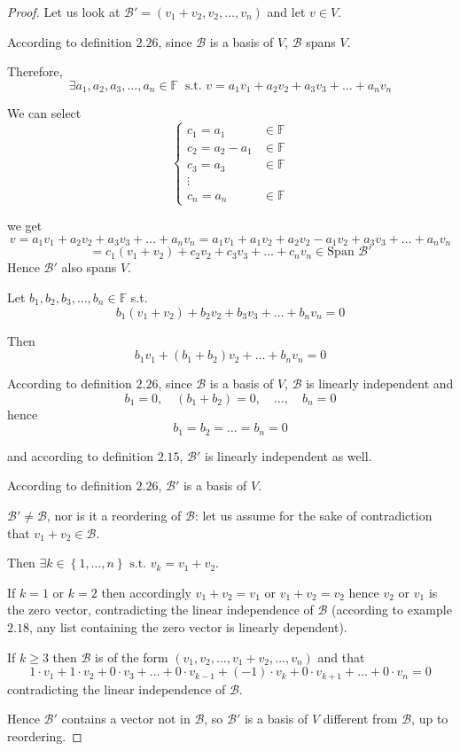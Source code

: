 \documentclass[english]{article}
\theoremstyle{definition}
\theoremstyle{plain}
\theoremstyle{remark}
\theoremstyle{plain}
\theoremstyle{plain}
\begin{document}
\begin{proof}
Let us look at $\mathcal{B}'=\left(v_{1}+v_{2},v_{2},\dots,v_{n}\right)$
and let $v\in V$.

According to definition $2.26$, since $\mathcal{B}$ is a basis of
$V$, $\mathcal{B}$ spans $V$. 

Therefore, 
\[
\exists a_{1},a_{2},a_{3},\dots,a_{n}\in\mathbb{F}\ \text{ s.t. }v=a_{1}v_{1}+a_{2}v_{2}+a_{3}v_{3}+\dots+a_{n}v_{n}
\]

We can select
\[
\begin{cases}
c_{1}=a_{1} & \in\mathbb{F}\\
c_{2}=a_{2}-a_{1} & \in\mathbb{F}\\
c_{3}=a_{3} & \in\mathbb{F}\\
\vdots\\
c_{n}=a_{n} & \in\mathbb{F}
\end{cases}
\]

we get 
\[
v=a_{1}v_{1}+a_{2}v_{2}+a_{3}v_{3}+\dots+a_{n}v_{n}=a_{1}v_{1}+a_{1}v_{2}+a_{2}v_{2}-a_{1}v_{2}+a_{3}v_{3}+\dots+a_{n}v_{n}
\]
\[
=c_{1}\left(v_{1}+v_{2}\right)+c_{2}v_{2}+c_{3}v_{3}+\dots+c_{n}v_{n}\in\text{Span }\mathcal{B}'
\]
Hence $\mathcal{B}'$ also spans $V$.

Let $b_{1},b_{2},b_{3},\dots,b_{n}\in\mathbb{F}$ s.t. 
\[
b_{1}\left(v_{1}+v_{2}\right)+b_{2}v_{2}+b_{3}v_{3}+\dots+b_{n}v_{n}=0
\]

Then
\[
b_{1}v_{1}+\left(b_{1}+b_{2}\right)v_{2}+\dots+b_{n}v_{n}=0
\]

According to definition $2.26$, since $\mathcal{B}$ is a basis of
$V$, $\mathcal{B}$ is linearly independent and
\[
b_{1}=0,\quad\left(b_{1}+b_{2}\right)=0,\quad\dots,\quad b_{n}=0
\]
hence 
\[
b_{1}=b_{2}=\dots=b_{n}=0
\]

and according to definition $2.15$, $\mathcal{B}'$ is linearly independent
as well.

According to definition $2.26$, $\mathcal{B}'$ is a basis of $V$.

$\mathcal{B}'\ne\mathcal{B}$, nor is it a reordering of $\mathcal{B}$:
let us assume for the sake of contradiction that $v_{1}+v_{2}\in\mathcal{B}$.

Then $\exists k\in\left\{ 1,\dots,n\right\} \text{ s.t. }v_{k}=v_{1}+v_{2}$.

If $k=1$ or $k=2$ then accordingly $v_{1}+v_{2}=v_{1}$ or $v_{1}+v_{2}=v_{2}$
hence $v_{2}$ or $v_{1}$ is the zero vector, contradicting the linear
independence of $\mathcal{B}$ (according to example $2.18$, any
list containing the zero vector is linearly dependent).

If $k\ge3$ then $\mathcal{B}$ is of the form $\left(v_{1},v_{2},\dots,v_{1}+v_{2},\dots,v_{n}\right)$
and that 
\[
1\cdot v_{1}+1\cdot v_{2}+0\cdot v_{3}+\dots+0\cdot v_{k-1}+\left(-1\right)\cdot v_{k}+0\cdot v_{k+1}+\dots+0\cdot v_{n}=0
\]
contradicting the linear independence of $\mathcal{B}$.

Hence $\mathcal{B}'$ contains a vector not in $\mathcal{B}$, so
$\mathcal{B}'$ is a basis of $V$ different from $\mathcal{B}$,
up to reordering.
\end{proof}
\end{document}
